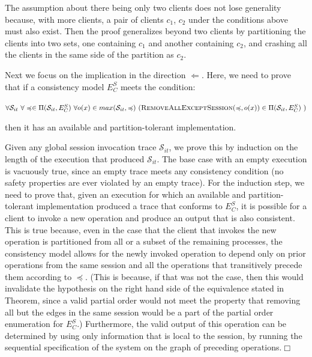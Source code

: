 \documentclass[journal,compsoc]{IEEEtran}
\begin{document}
The assumption about there being only two clients does not lose generality because, with more clients, a pair of clients $c_1$, $c_2$ under the conditions above must also exist. Then the proof generalizes beyond two clients by partitioning the clients into two sets, one containing $c_1$ and another containing $c_2$, and crashing all the clients in the same side of the partition as $c_2$.

Next we focus on the implication in the direction $\Leftarrow$. Here, we need to prove that if a consistency model $E^S_C$ meets the condition:

\noindent $\forall \mathcal{S}_{it} ~ \forall \preccurlyeq \in \Pi(\mathcal{S}_{it},E^S_C) ~ \forall o(x) \in max(\mathcal{S}_{it}, \preccurlyeq) ~ (\textsc{RemoveAllExceptSession}(\preccurlyeq,o(x)) \in \Pi(\mathcal{S}_{it},E^S_C) ~ ) $

then it has an available and partition-tolerant implementation.



Given any global session invocation trace $\mathcal{S}_{it}$, we prove this by induction on the length of the execution that produced $\mathcal{S}_{it}$. The base case with an empty execution is vacuously true, since an empty trace meets any consistency condition (no safety properties are ever violated by an empty trace). For the induction step, we need to prove that, given an execution for which an available and partition-tolerant implementation produced a trace that conforms to $E^S_C$, it is possible for a client to invoke a new operation and produce an output that is also consistent. This is true because, even in the case that the client that invokes the new operation is partitioned from all or a subset of the remaining processes, the consistency model allows for the newly invoked operation to depend only on prior operations from the same session and all the operations that transitively precede them according to $\preccurlyeq$. (This is because, if that was not the case, then this would invalidate the hypothesis on the right hand side of the equivalence stated in Theorem, since a valid partial order would not meet the property that removing all but the edges in the same session would be a part of the partial order enumeration for $E^S_C$.)  Furthermore, the valid output of this operation can be determined by using only information that is local to the session, by running the sequential specification of the system on the graph of preceding operations.$\Box$

\end{document}
